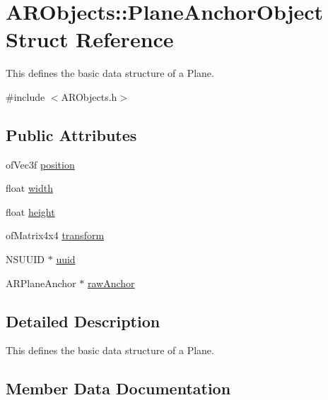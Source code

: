 \hypertarget{struct_a_r_objects_1_1_plane_anchor_object}{}\section{A\+R\+Objects\+:\+:Plane\+Anchor\+Object Struct Reference}
\label{struct_a_r_objects_1_1_plane_anchor_object}


This defines the basic data structure of a Plane.  




{\ttfamily \#include $<$A\+R\+Objects.\+h$>$}

\subsection*{Public Attributes}
\begin{DoxyCompactItemize}
\item 
of\+Vec3f \hyperlink{struct_a_r_objects_1_1_plane_anchor_object_a1e91b9c289ed6a8379e8106479b30650}{position}
\item 
float \hyperlink{struct_a_r_objects_1_1_plane_anchor_object_a66571f63611c3fe8c8161c18b5d163cc}{width}
\item 
float \hyperlink{struct_a_r_objects_1_1_plane_anchor_object_a7114f6bc16cf36662c1a73e34d2d2314}{height}
\item 
of\+Matrix4x4 \hyperlink{struct_a_r_objects_1_1_plane_anchor_object_a683ab536baa0f5b81b11deeca121ce5b}{transform}
\item 
N\+S\+U\+U\+ID $\ast$ \hyperlink{struct_a_r_objects_1_1_plane_anchor_object_ab20601adc6ffd5698f0c91acf861c92b}{uuid}
\item 
A\+R\+Plane\+Anchor $\ast$ \hyperlink{struct_a_r_objects_1_1_plane_anchor_object_a4d6b3acc9e0a17fe3f5357f99a176101}{raw\+Anchor}
\end{DoxyCompactItemize}


\subsection{Detailed Description}
This defines the basic data structure of a Plane. 

\subsection{Member Data Documentation}
\mbox{\label{struct_a_r_objects_1_1_plane_anchor_object_a7114f6bc16cf36662c1a73e34d2d2314}} 
